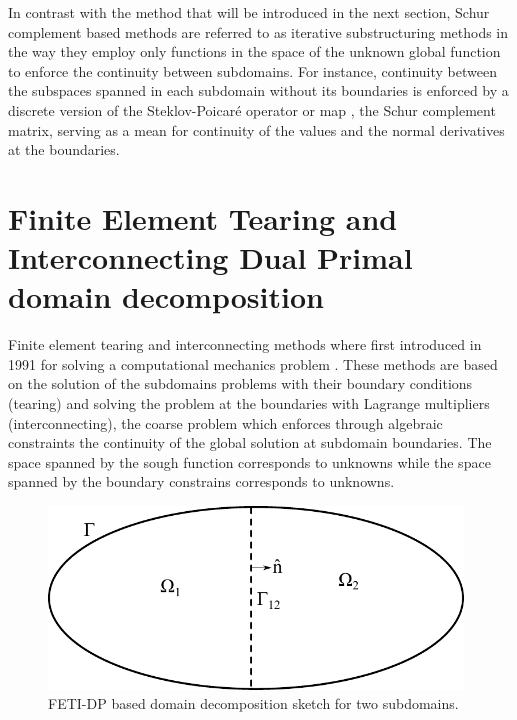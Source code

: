 In contrast with the method that will be introduced in the next section, Schur complement based methods are referred to as  iterative substructuring methods in the way they employ only functions in the space of the unknown global function to enforce the continuity between subdomains. For instance, continuity between the subspaces spanned in each subdomain without its boundaries is enforced by a discrete version of the Steklov-Poicar\'e operator or  map \cite{mathew2008domain}, the Schur complement matrix, serving as a mean for continuity of the values and the normal derivatives at the boundaries.

\section[FETI-DP domain decomposition]{Finite Element Tearing and Interconnecting Dual Primal domain decomposition} \label{sec:FETIDD}


Finite element tearing and interconnecting methods where first introduced in 1991 for solving a computational mechanics problem \cite{farhat1991method}. These methods are based on the solution of the subdomains problems with their boundary conditions (tearing) and solving the problem at the boundaries with Lagrange multipliers (interconnecting), the coarse problem which enforces through algebraic constraints the continuity of the global solution at subdomain boundaries. The space spanned by the sough function corresponds to  unknowns while the space spanned by  the boundary constrains corresponds to  unknowns.

\begin{figure}[h]
\centering
\includegraphics[width=11cm]{DDFETI}
\caption{FETI-DP based domain decomposition sketch for two subdomains.}
\label{fig:DDFETI}
\end{figure}

